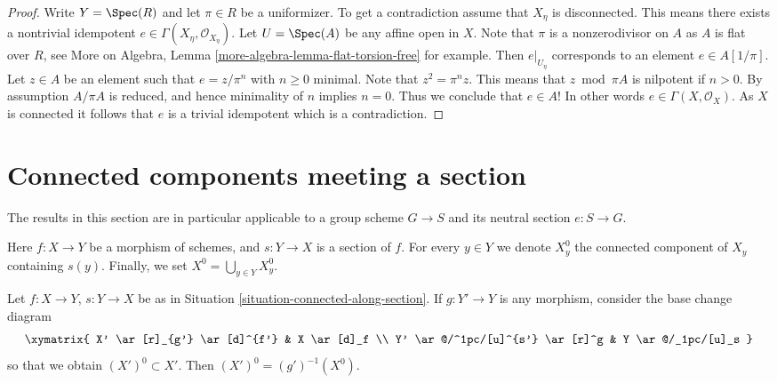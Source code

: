 \begin{proof}
Write $Y = \Spec(R)$ and let $\pi \in R$ be a uniformizer.
To get a contradiction assume that $X_\eta$ is disconnected.
This means there exists a nontrivial idempotent
$e \in \Gamma(X_\eta, \mathcal{O}_{X_\eta})$.
Let $U = \Spec(A)$ be any affine open in $X$.
Note that $\pi$ is a nonzerodivisor on $A$ as $A$ is flat over $R$, see
More on Algebra, Lemma \ref{more-algebra-lemma-flat-torsion-free}
for example. Then $e|_{U_\eta}$ corresponds to an element $e \in A[1/\pi]$.
Let $z \in A$ be an element such that $e = z/\pi^n$ with $n \geq 0$ minimal.
Note that $z^2 = \pi^nz$. This means that $z \bmod \pi A$ is nilpotent
if $n > 0$. By assumption $A/\pi A$ is reduced, and hence minimality of
$n$ implies $n = 0$. Thus we conclude that $e \in A$! In other words
$e \in \Gamma(X, \mathcal{O}_X)$. As $X$ is connected it follows
that $e$ is a trivial idempotent which is a contradiction.
\end{proof}







\section{Connected components meeting a section}
\label{section-connected-components}

\noindent
The results in this section are in particular applicable to a group scheme
$G \to S$ and its neutral section $e : S \to G$.

\begin{situation}
\label{situation-connected-along-section}
Here $f : X \to Y$ be a morphism of schemes, and
$s : Y \to X$ is a section of $f$.
For every $y \in Y$ we denote $X^0_y$ the connected component of $X_y$
containing $s(y)$. Finally, we set $X^0 = \bigcup_{y \in Y} X^0_y$.
\end{situation}

\begin{lemma}
\label{lemma-base-change-connected-along-section}
Let $f : X \to Y$, $s : Y \to X$ be as in
Situation \ref{situation-connected-along-section}.
If $g : Y' \to Y$ is any morphism, consider the base change diagram
$$
\xymatrix{
X' \ar[r]_{g'} \ar[d]^{f'} & X \ar[d]_f \\
Y' \ar@/^1pc/[u]^{s'} \ar[r]^g & Y \ar@/_1pc/[u]_s
}
$$
so that we obtain $(X')^0 \subset X'$.
Then $(X')^0 = (g')^{-1}(X^0)$.
\end{lemma}

